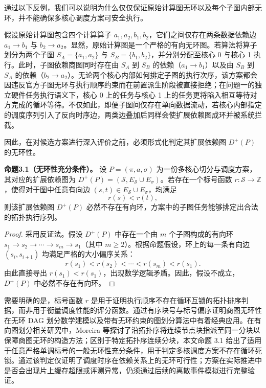 \documentclass[anonymous,withtoc]{gmcm2026}
\begin{document}
通过以下反例，我们可以说明为什么仅仅保证原始计算图无环以及每个子图内部无环，并不能确保多核心调度方案可安全执行。

假设原始计算图包含四个计算算子 \(a_1, a_2, b_1, b_2\)，它们之间仅存在两条数据依赖边 \(a_1 \to b_1\) 与 \(b_2 \to a_2\)。显然，原始计算图是一个严格的有向无环图。若算法将算子划分为两个子图 \(S_A = \{a_1, a_2\}\) 与 \(S_B = \{b_1, b_2\}\)，并分别分配至核心 0 与核心 1 执行。此时，子图依赖商图同时存在由 \(S_A\) 到 \(S_B\) 的依赖（\(a_1 \to b_1\)）以及由 \(S_B\) 到 \(S_A\) 的依赖（\(b_2 \to a_2\)）。无论两个核心内部如何排定子图的执行次序，该方案都会因违反官方子图无环与执行顺序约束而在前置派生阶段被直接拒绝；在问题一的独立硬件任务执行语义下，核心 0 上的任务与核心 1 上的任务更将陷入相互等待对方完成的循环等待。不仅如此，即便子图间仅存在单向数据流动，若核心内部指定的调度序列引入了反向时序边，两类边叠加后同样会使扩展依赖图成环并被系统拦截。

因此，在对候选方案进行深入评价之前，必须形式化判定其扩展依赖图 \(D^+(P)\) 的无环性。

\textbf{命题3.1（无环性充分条件）。} 设 \(P = (\pi, a, \sigma)\) 为一份多核心切分与调度方案，其对应的扩展依赖图为 \(D^+(P) = (\mathcal{S}, E_{\mathcal{S}} \cup E_\sigma)\)。若存在一个标号函数 \(r: \mathcal{S} \to \mathbb{Z}\)，使得对于图中任意有向边 \((s, t) \in E_{\mathcal{S}} \cup E_\sigma\)，均满足 \begin{equation}
r(s) < r(t),
\end{equation} 则该扩展依赖图 \(D^+(P)\) 必然不存在有向环，方案中的子图任务能够排定出合法的拓扑执行序列。

\begin{proof} 采用反证法。假设 \(D^+(P)\) 中存在一个由 \(m\) 个子图构成的有向环 \(s_1 \to s_2 \to \cdots \to s_m \to s_1\)（其中 \(m \ge 2\)）。根据命题假设，环上的每一条有向边 \((s_i, s_{i+1})\) 均满足严格的大小偏序关系： \begin{equation}
r(s_1) < r(s_2) < \cdots < r(s_m) < r(s_1).
\end{equation} 由此直接导出 \(r(s_1) < r(s_1)\)，出现数学逻辑矛盾。因此，假设不成立，\(D^+(P)\) 中必然不存在有向环。 \end{proof}

需要明确的是，标号函数 \(r\) 是用于证明执行顺序不存在循环互锁的拓扑排序判据，而非用于衡量调度性能的评分函数。通过有序块号与标号偏序证明商图无环性在无环 DAG 划分数学建模\cite{ref7}以及带有无环约束的图划分算法\cite{ref18}中有着经典应用。在有向图划分相关研究中，Moreira 等\cite{ref18}探讨了沿拓扑序将连续节点块指派至同一分块以保障商图无环的构造方法；区别于特定拓扑序连续分块，本文命题 3.1 给出了适用于任意严格单调标号的一般无环性充分条件，用于判定多核调度方案不存在循环死锁。通过该判定仅证明了调度时序在依赖关系上的无环可行性；方案在实际推进中是否会出现片上缓存超限或评测异常，仍须通过后续的离散事件模拟进行完整验证。
\end{document}
